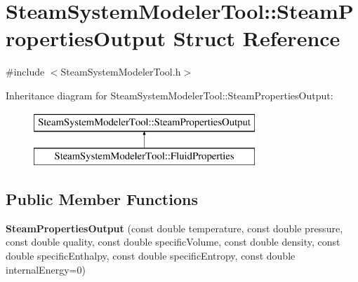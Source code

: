 \hypertarget{struct_steam_system_modeler_tool_1_1_steam_properties_output}{}\section{Steam\+System\+Modeler\+Tool\+:\+:Steam\+Properties\+Output Struct Reference}
\label{struct_steam_system_modeler_tool_1_1_steam_properties_output}


{\ttfamily \#include $<$Steam\+System\+Modeler\+Tool.\+h$>$}

Inheritance diagram for Steam\+System\+Modeler\+Tool\+:\+:Steam\+Properties\+Output\+:\begin{figure}[H]
\begin{center}
\leavevmode
\includegraphics[height=2.000000cm]{dd/d51/struct_steam_system_modeler_tool_1_1_steam_properties_output}
\end{center}
\end{figure}
\subsection*{Public Member Functions}
\begin{DoxyCompactItemize}
\item 
\mbox{\label{struct_steam_system_modeler_tool_1_1_steam_properties_output_a71898911793b8e08d8565c206335c3ae}} 
{\bfseries Steam\+Properties\+Output} (const double temperature, const double pressure, const double quality, const double specific\+Volume, const double density, const double specific\+Enthalpy, const double specific\+Entropy, const double internal\+Energy=0)
\end{DoxyCompactItemize}
